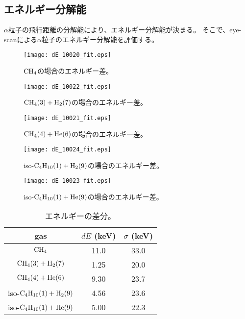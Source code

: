 \documentclass[../master]{subfiles}
\begin{document}
\subsection{エネルギー分解能}
$\alpha$粒子の飛行距離の分解能により、エネルギー分解能が決まる。
そこで、eye-scanによる$\alpha$粒子のエネルギー分解能を評価する。
\begin{figure}
  \centering
  \begin{minipage}{0.45\columnwidth}
    \centering
    \texttt{[image: dE\_10020\_fit.eps]}
    \caption{$\rm CH_{4}$の場合のエネルギー差。}
    \label{fig::dE_ch4}
  \end{minipage}
\end{figure}
\begin{figure}
  \begin{minipage}{0.45\columnwidth}
    \centering
    \texttt{[image: dE\_10022\_fit.eps]}
    \caption{$\rm CH_{4} (3) + H_{2} (7)$の場合のエネルギー差。}
    \label{fig::dE_ch4_h2}
  \end{minipage}
  \centering
  \begin{minipage}{0.45\columnwidth}
    \centering
    \texttt{[image: dE\_10021\_fit.eps]}
    \caption{$\rm CH_{4} (4) + He(6)$の場合のエネルギー差。}
    \label{fig::dE_ch4_he}
  \end{minipage}
\end{figure}
\begin{figure}
  \begin{minipage}{0.45\columnwidth}
    \centering
    \texttt{[image: dE\_10024\_fit.eps]}
    \caption{iso-$\rm C_{4}H_{10} (1) + H_{2} (9)$の場合のエネルギー差。}
    \label{fig::dE_ic4h10_h2}
  \end{minipage}
  \centering
  \begin{minipage}{0.45\columnwidth}
    \centering
    \texttt{[image: dE\_10023\_fit.eps]}
    \caption{iso-$\rm C_{4}H_{10} (1) + He (9)$の場合のエネルギー差。}
    \label{fig::dE_ic4h10_he}
  \end{minipage}
\end{figure}
\begin{table}
  \centering
  \caption{エネルギーの差分。}
  \label{tab::energy_resolution}
  \begin{tabular}{ccc}
    \toprule
    gas & $dE$ (keV) & $\sigma$ (keV) \\
    \midrule
    $\rm CH_{4}$ & 11.0 & 33.0  \\
    $\rm CH_{4} (3) + H_{2} (7)$ & 1.25 & 20.0 \\
    $\rm CH_{4} (4) + He (6)$ & 9.30 & 23.7 \\
    iso-$\rm C_{4}H_{10} (1) + H_{2} (9)$ & 4.56 & 23.6 \\
    iso-$\rm C_{4}H_{10} (1) + He (9)$ & 5.00 & 22.3 \\
    \bottomrule
  \end{tabular}
\end{table}
\end{document}
